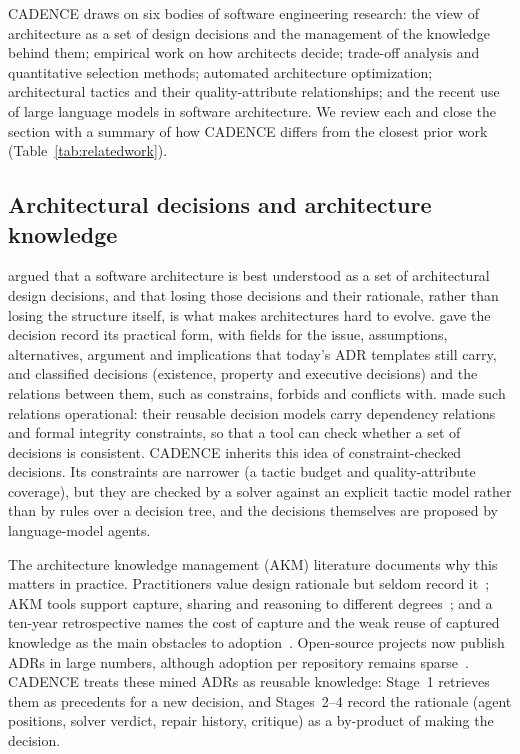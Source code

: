\documentclass[preprint,12pt,authoryear]{elsarticle}
\renewcommand{\_}{\textunderscore\allowbreak{}}
\begin{document}
CADENCE draws on six bodies of software engineering research: the view of architecture as a set of design decisions and the management of the knowledge behind them; empirical work on how architects decide; trade-off analysis and quantitative selection methods; automated architecture optimization; architectural tactics and their quality-attribute relationships; and the recent use of large language models in software architecture. We review each and close the section with a summary of how CADENCE differs from the closest prior work (Table~\ref{tab:relatedwork}).

\subsection{Architectural decisions and architecture knowledge}

\citet{jansen2005} argued that a software architecture is best understood as a set of architectural design decisions, and that losing those decisions and their rationale, rather than losing the structure itself, is what makes architectures hard to evolve. \citet{tyree2005} gave the decision record its practical form, with fields for the issue, assumptions, alternatives, argument and implications that today's ADR templates still carry, and \citet{kruchten2004} classified decisions (existence, property and executive decisions) and the relations between them, such as constrains, forbids and conflicts with. \citet{zimmermann2009} made such relations operational: their reusable decision models carry dependency relations and formal integrity constraints, so that a tool can check whether a set of decisions is consistent. CADENCE inherits this idea of constraint-checked decisions. Its constraints are narrower (a tactic budget and quality-attribute coverage), but they are checked by a solver against an explicit tactic model rather than by rules over a decision tree, and the decisions themselves are proposed by language-model agents.

The architecture knowledge management (AKM) literature documents why this matters in practice. Practitioners value design rationale but seldom record it~\citep{tang2006}; AKM tools support capture, sharing and reasoning to different degrees~\citep{tang2010}; and a ten-year retrospective names the cost of capture and the weak reuse of captured knowledge as the main obstacles to adoption~\citep{capilla2016}. Open-source projects now publish ADRs in large numbers, although adoption per repository remains sparse~\citep{buchgeher2023adr}. CADENCE treats these mined ADRs as reusable knowledge: Stage~1 retrieves them as precedents for a new decision, and Stages~2--4 record the rationale (agent positions, solver verdict, repair history, critique) as a by-product of making the decision.
\end{document}
